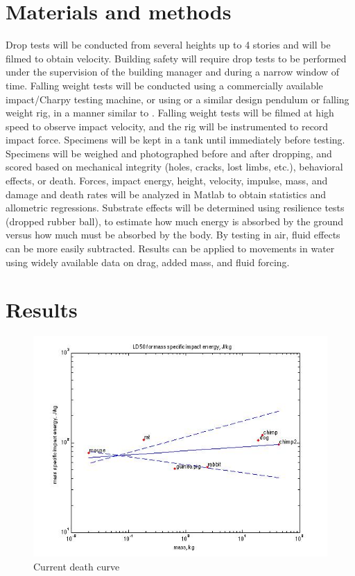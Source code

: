 \documentclass{article}
\begin{document}
\section{Materials and methods}
Drop tests will be conducted from several heights up to 4 stories and will be filmed to obtain velocity.  Building safety will require drop tests to be performed under the supervision of the building manager and during a narrow window of time.  Falling weight tests will be conducted using a commercially available impact/Charpy testing machine, or using or a similar design pendulum or falling weight rig, in a manner similar to \citet{Strathmann:1981}.  Falling weight tests will be filmed at high speed to observe impact velocity, and the rig will be instrumented to record impact force.  Specimens will be kept in a tank until immediately before testing.  Specimens will be weighed and photographed before and after dropping, and scored based on mechanical integrity (holes, cracks, lost limbs, etc.), behavioral effects, or death.  Forces, impact energy, height, velocity, impulse, mass, and damage and death rates will be analyzed in Matlab to obtain statistics and allometric regressions.  Substrate effects will be determined using resilience tests (dropped rubber ball), to estimate how much energy is absorbed by the ground versus how much must be absorbed by the body.  By testing in air, fluid effects can be more easily subtracted.  Results can be applied to movements in water using widely available data on drag, added mass, and fluid forcing. 

\section{Results}

\begin{figure}
\begin{center}
\includegraphics[width=\textwidth]{figures/current-death-curve.jpg}
\end{center}
\caption{Current death curve}
\end{figure}
\end{document}
